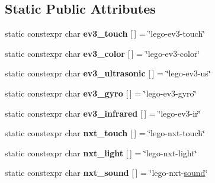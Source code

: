 \subsection*{Static Public Attributes}
\begin{DoxyCompactItemize}
\item 
\mbox{\label{classev3dev_1_1sensor_a746585cd7b302069b343d80928273eee}} 
static constexpr char {\bfseries ev3\+\_\+touch} \mbox{[}$\,$\mbox{]} = \char`\"{}lego-\/ev3-\/touch\char`\"{}
\item 
\mbox{\label{classev3dev_1_1sensor_aae6463163b8f67965a2c80af8065df31}} 
static constexpr char {\bfseries ev3\+\_\+color} \mbox{[}$\,$\mbox{]} = \char`\"{}lego-\/ev3-\/color\char`\"{}
\item 
\mbox{\label{classev3dev_1_1sensor_af6dc7141f2fe434848773b08108e809a}} 
static constexpr char {\bfseries ev3\+\_\+ultrasonic} \mbox{[}$\,$\mbox{]} = \char`\"{}lego-\/ev3-\/us\char`\"{}
\item 
\mbox{\label{classev3dev_1_1sensor_a878e32eddf11facde13965ffea990cb6}} 
static constexpr char {\bfseries ev3\+\_\+gyro} \mbox{[}$\,$\mbox{]} = \char`\"{}lego-\/ev3-\/gyro\char`\"{}
\item 
\mbox{\label{classev3dev_1_1sensor_acb98003fbdda93cc5705e802975234ce}} 
static constexpr char {\bfseries ev3\+\_\+infrared} \mbox{[}$\,$\mbox{]} = \char`\"{}lego-\/ev3-\/ir\char`\"{}
\item 
\mbox{\label{classev3dev_1_1sensor_a20a72bfa400b146eeb54de3c0d7bb0a3}} 
static constexpr char {\bfseries nxt\+\_\+touch} \mbox{[}$\,$\mbox{]} = \char`\"{}lego-\/nxt-\/touch\char`\"{}
\item 
\mbox{\label{classev3dev_1_1sensor_af88ae60fd9bc931617245b83ac140002}} 
static constexpr char {\bfseries nxt\+\_\+light} \mbox{[}$\,$\mbox{]} = \char`\"{}lego-\/nxt-\/light\char`\"{}
\item 
\mbox{\label{classev3dev_1_1sensor_a2521e22b111821a8a8453a70046828fa}} 
static constexpr char {\bfseries nxt\+\_\+sound} \mbox{[}$\,$\mbox{]} = \char`\"{}lego-\/nxt-\/\hyperlink{classev3dev_1_1sound}{sound}\char`\"{}

\end{DoxyCompactItemize}

